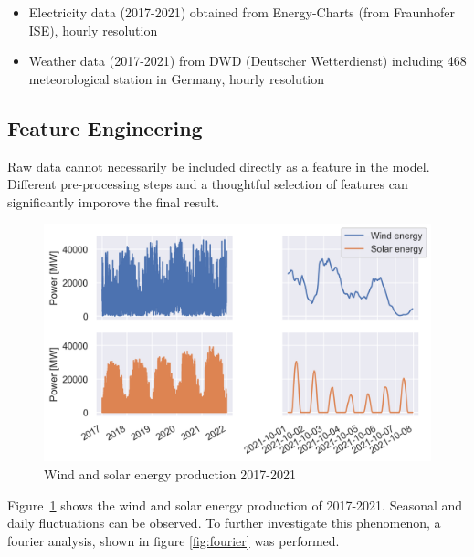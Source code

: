 \documentclass[11pt,table]{article}
\begin{document}
\begin{itemize}
  \item Electricity data (2017-2021) obtained from Energy-Charts (from Fraunhofer ISE), hourly resolution
  \item Weather data (2017-2021) from DWD (Deutscher Wetterdienst) including 468 meteorological station in Germany, hourly resolution
\end{itemize}%

\subsection{Feature Engineering}
Raw data cannot necessarily be included directly as a feature in the model. Different pre-processing steps and a thoughtful selection of features can significantly imporove the final result. 

\begin{figure}[h!]
	\centering
	\includegraphics[scale=0.9]{Figures/electrData.png}
	\caption{Wind and solar energy production 2017-2021}
	\label{fig:electrData}
\end{figure}

Figure~\ref{fig:electrData} shows the wind and solar energy production of 2017-2021. Seasonal and daily fluctuations can be observed. To further investigate this phenomenon, a fourier analysis, shown in figure \ref{fig:fourier} was performed.
\end{document}

